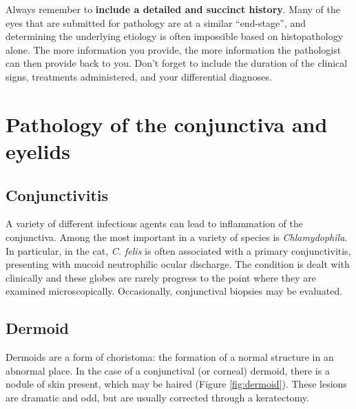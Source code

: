 \documentclass[openany]{article}
\begin{document}
Always remember to \textbf{include a detailed and succinct history}.
Many of the eyes that are submitted for pathology are at a similar
``end-stage'', and determining the underlying etiology is often
impossible based on histopathology alone. The more information you
provide, the more information the pathologist can then provide back to
you. Don't forget to include the duration of the clinical signs,
treatments administered, and your differential diagnoses.

\section{Pathology of the conjunctiva and
eyelids}\label{pathology-of-the-conjunctiva-and-eyelids}

\subsection{Conjunctivitis}\label{conjunctivitis}

A variety of different infectious agents can lead to inflammation of the
conjunctiva. Among the most important in a variety of species is
\emph{Chlamydophila}. In particular, in the cat, \emph{C. felis} is
often associated with a primary conjunctivitis, presenting with mucoid
neutrophilic ocular discharge. The condition is dealt with clinically
and these globes are rarely progress to the point where they are
examined microscopically. Occasionally, conjunctival biopsies may be
evaluated.

\subsection{Dermoid}\label{dermoid}

Dermoids are a form of choristoma: the formation of a normal structure
in an abnormal place. In the case of a conjunctival (or corneal)
dermoid, there is a nodule of skin present, which may be haired (Figure
\ref{fig:dermoid}). These lesions are dramatic and odd, but are usually
corrected through a keratectomy.
\end{document}
